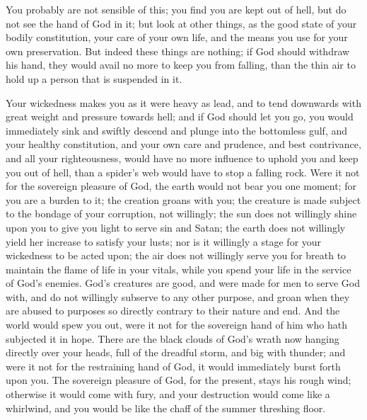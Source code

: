 \documentclass[
]{book}
\begin{document}
You probably are not sensible of this; you find you are kept out of hell, but do not see the hand of God in it; but look at other things, as the good state of your bodily constitution, your care of your own life, and the means you use for your own preservation. But indeed these things are nothing; if God should withdraw his hand, they would avail no more to keep you from falling, than the thin air to hold up a person that is suspended in it.

Your wickedness makes you as it were heavy as lead, and to tend downwards with great weight and pressure towards hell; and if God should let you go, you would immediately sink and swiftly descend and plunge into the bottomless gulf, and your healthy constitution, and your own care and prudence, and best contrivance, and all your righteousness, would have no more influence to uphold you and keep you out of hell, than a spider's web would have to stop a falling rock. Were it not for the sovereign pleasure of God, the earth would not bear you one moment; for you are a burden to it; the creation groans with you; the creature is made subject to the bondage of your corruption, not willingly; the sun does not willingly shine upon you to give you light to serve sin and Satan; the earth does not willingly yield her increase to satisfy your lusts; nor is it willingly a stage for your wickedness to be acted upon; the air does not willingly serve you for breath to maintain the flame of life in your vitals, while you spend your life in the service of God's enemies. God's creatures are good, and were made for men to serve God with, and do not willingly subserve to any other purpose, and groan when they are abused to purposes so directly contrary to their nature and end. And the world would spew you out, were it not for the sovereign hand of him who hath subjected it in hope. There are the black clouds of God's wrath now hanging directly over your heads, full of the dreadful storm, and big with thunder; and were it not for the restraining hand of God, it would immediately burst forth upon you. The sovereign pleasure of God, for the present, stays his rough wind; otherwise it would come with fury, and your destruction would come like a whirlwind, and you would be like the chaff of the summer threshing floor.
\end{document}
